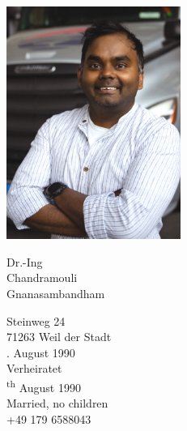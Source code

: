 \documentclass{mycv}
\begin{document}
\sloppy %
\color{templateColor1}

\normalfont
\begin{minipage}[c]{0.32\textwidth}
  \includegraphics[width=5.7cm]{../img/CV_Photo_Informal_Comp.png}
\end{minipage}
\begin{minipage}[]{0.8\textwidth}
    \vspace{5mm}

    {\huge Dr.-Ing }\\

    {\Huge Chandramouli}\\

    {\Huge Gnanasambandham}
    \vspace{2mm}

    \vspace{2mm}

    {\large
        Steinweg 24\\
        71263 Weil der Stadt\\

        {
            . August 1990\\
            \maritalStatusIcon Verheiratet\\
        }
        {
            \textsuperscript{th} August 1990\\
            \maritalStatusIcon Married, no children\\
        }
        \telephoneIcon +49 179 6588043\\
        \mailIcon \href{mailto:chandramouli681990@gmail.com}{}
    }
  
    \vspace{13mm}
\end{minipage}
\end{document}
